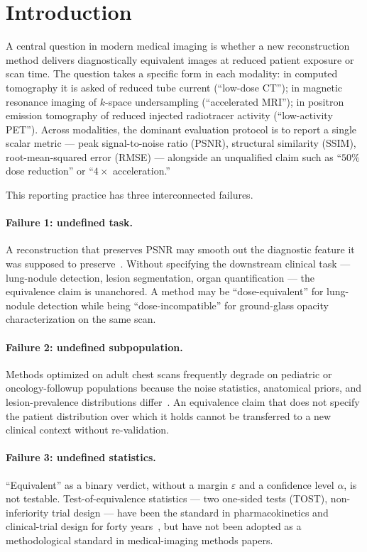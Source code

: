 \documentclass[twoside,11pt]{article}
\begin{document}
\section{Introduction}

A central question in modern medical imaging is whether a new reconstruction method delivers diagnostically equivalent images at reduced patient exposure or scan time. The question takes a specific form in each modality: in computed tomography it is asked of reduced tube current (``low-dose CT''); in magnetic resonance imaging of $k$-space undersampling (``accelerated MRI''); in positron emission tomography of reduced injected radiotracer activity (``low-activity PET''). Across modalities, the dominant evaluation protocol is to report a single scalar metric --- peak signal-to-noise ratio (PSNR), structural similarity (SSIM), root-mean-squared error (RMSE) --- alongside an unqualified claim such as ``$50\%$ dose reduction'' or ``$4\times$ acceleration.''

This reporting practice has three interconnected failures.

\paragraph{Failure 1: undefined task.} A reconstruction that preserves PSNR may smooth out the diagnostic feature it was supposed to preserve~\citep{kim2019smoothing,christianson2015}. Without specifying the downstream clinical task --- lung-nodule detection, lesion segmentation, organ quantification --- the equivalence claim is unanchored. A method may be ``dose-equivalent'' for lung-nodule detection while being ``dose-incompatible'' for ground-glass opacity characterization on the same scan.

\paragraph{Failure 2: undefined subpopulation.} Methods optimized on adult chest scans frequently degrade on pediatric or oncology-followup populations because the noise statistics, anatomical priors, and lesion-prevalence distributions differ~\citep{fda_aiml_2024,larson2018pediatric}. An equivalence claim that does not specify the patient distribution over which it holds cannot be transferred to a new clinical context without re-validation.

\paragraph{Failure 3: undefined statistics.} ``Equivalent'' as a binary verdict, without a margin $\varepsilon$ and a confidence level $\alpha$, is not testable. Test-of-equivalence statistics --- two one-sided tests (TOST), non-inferiority trial design --- have been the standard in pharmacokinetics and clinical-trial design for forty years~\citep{schuirmann1987tost,piaggio2012ni}, but have not been adopted as a methodological standard in medical-imaging methods papers.
\end{document}
